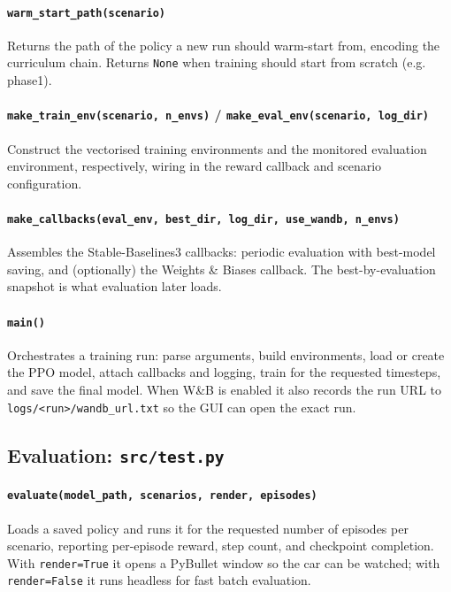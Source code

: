 \documentclass[11pt]{article}
\begin{document}
\paragraph{\texttt{warm\_start\_path(scenario)}}
Returns the path of the policy a new run should warm-start from, encoding the
curriculum chain. Returns \texttt{None} when training should start from
scratch (e.g. phase1).

\paragraph{\texttt{make\_train\_env(scenario, n\_envs)} /
\texttt{make\_eval\_env(scenario, log\_dir)}}
Construct the vectorised training environments and the monitored evaluation
environment, respectively, wiring in the reward callback and scenario
configuration.

\paragraph{\texttt{make\_callbacks(eval\_env, best\_dir, log\_dir, use\_wandb, n\_envs)}}
Assembles the Stable-Baselines3 callbacks: periodic evaluation with best-model
saving, and (optionally) the Weights \& Biases callback. The
best-by-evaluation snapshot is what evaluation later loads.

\paragraph{\texttt{main()}}
Orchestrates a training run: parse arguments, build environments, load or
create the PPO model, attach callbacks and logging, train for the requested
timesteps, and save the final model. When W\&B is enabled it also records the
run URL to \texttt{logs/<run>/wandb\_url.txt} so the GUI can open the exact run.

\subsection{Evaluation: \texttt{src/test.py}}

\paragraph{\texttt{evaluate(model\_path, scenarios, render, episodes)}}
Loads a saved policy and runs it for the requested number of episodes per
scenario, reporting per-episode reward, step count, and checkpoint completion.
With \texttt{render=True} it opens a PyBullet window so the car can be watched;
with \texttt{render=False} it runs headless for fast batch evaluation.
\end{document}

